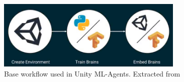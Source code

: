     \begin{figure}[!ht]
        \centering
        \includegraphics[width=3.5in]{./chapters/imgs/img_unity_mlagents_workflow.png}
        \caption[unity ml agents workflow]{Base workflow used in Unity ML-Agents. Extracted from \citet{unity-ml-agents}}
        \label{fig:unity-ml-agents-workflow}
    \end{figure}